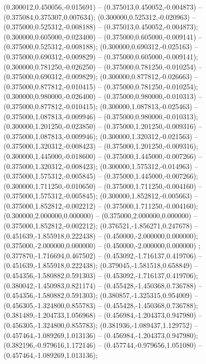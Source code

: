  (0.300012,0.450056,-0.015691) -- (0.375013,0.450052,-0.004873) -- (0.375084,0.375307,0.007634);
 (0.300000,0.525312,-0.020963) -- (0.375000,0.525312,-0.008188) -- (0.375013,0.450052,-0.004873);
 (0.300000,0.605000,-0.023400) -- (0.375000,0.605000,-0.009141) -- (0.375000,0.525312,-0.008188);
 (0.300000,0.690312,-0.025163) -- (0.375000,0.690312,-0.009829) -- (0.375000,0.605000,-0.009141);
 (0.300000,0.781250,-0.026250) -- (0.375000,0.781250,-0.010254) -- (0.375000,0.690312,-0.009829);
 (0.300000,0.877812,-0.026663) -- (0.375000,0.877812,-0.010415) -- (0.375000,0.781250,-0.010254);
 (0.300000,0.980000,-0.026400) -- (0.375000,0.980000,-0.010313) -- (0.375000,0.877812,-0.010415);
 (0.300000,1.087813,-0.025463) -- (0.375000,1.087813,-0.009946) -- (0.375000,0.980000,-0.010313);
 (0.300000,1.201250,-0.023850) -- (0.375000,1.201250,-0.009316) -- (0.375000,1.087813,-0.009946);
 (0.300000,1.320312,-0.021563) -- (0.375000,1.320312,-0.008423) -- (0.375000,1.201250,-0.009316);
 (0.300000,1.445000,-0.018600) -- (0.375000,1.445000,-0.007266) -- (0.375000,1.320312,-0.008423);
 (0.300000,1.575312,-0.014963) -- (0.375000,1.575312,-0.005845) -- (0.375000,1.445000,-0.007266);
 (0.300000,1.711250,-0.010650) -- (0.375000,1.711250,-0.004160) -- (0.375000,1.575312,-0.005845);
 (0.300000,1.852812,-0.005663) -- (0.375000,1.852812,-0.002212) -- (0.375000,1.711250,-0.004160);
 (0.300000,2.000000,0.000000) -- (0.375000,2.000000,0.000000) -- (0.375000,1.852812,-0.002212);
 (0.376521,-1.856271,0.247678) -- (0.451639,-1.855918,0.222438) -- (0.450000,-2.000000,0.000000);
 (0.375000,-2.000000,0.000000) -- (0.450000,-2.000000,0.000000) ;
 (0.377870,-1.716694,0.467502) -- (0.453092,-1.716137,0.419706) -- (0.451639,-1.855918,0.222438);
 (0.379045,-1.581518,0.658849) -- (0.454356,-1.580882,0.591303) -- (0.453092,-1.716137,0.419706);
 (0.380042,-1.450983,0.821174) -- (0.455428,-1.450368,0.736788) -- (0.454356,-1.580882,0.591303);
 (0.380857,-1.325315,0.954009) -- (0.456305,-1.324800,0.855783) -- (0.455428,-1.450368,0.736788);
 (0.381489,-1.204733,1.056968) -- (0.456984,-1.204373,0.947980) -- (0.456305,-1.324800,0.855783);
 (0.381936,-1.089437,1.129752) -- (0.457464,-1.089269,1.013136) -- (0.456984,-1.204373,0.947980);
 (0.382196,-0.979616,1.172146) -- (0.457744,-0.979656,1.051080) -- (0.457464,-1.089269,1.013136);
